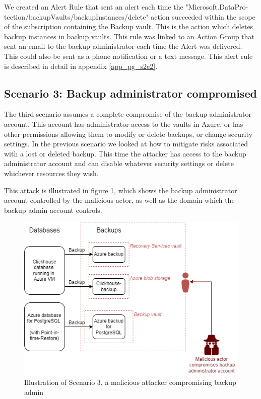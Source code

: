 We created an Alert Rule that sent an alert each time the "Microsoft.DataPro-tection/backupVaults/backupInstances/delete" action succeeded within the scope of the subscription containing the Backup vault. This is the action which deletes backup instances in backup vaults. This rule was linked to an Action Group that sent an email to the backup administrator each time the Alert was delivered. This could also be sent as a phone notification or a text message. This alert rule is described in detail in appendix \ref{app_pg_s2e2}. 

\subsection{Scenario 3: Backup administrator compromised}
The third scenario assumes a complete compromise of the backup administrator account.
This account has administrator access to the vaults in Azure,
or has other permissions allowing them to modify or delete backups, or change security settings.
In the previous scenario we looked at how to mitigate risks associated with a lost or deleted backup. This time the attacker has access to the backup administrator account and can disable whatever security settings or delete whichever resources they wish. 

This attack is illustrated in figure \ref{fig:scenario 3}, which shows the backup administrator account controlled by the malicious actor, as well as the domain which the backup admin account controls.

\begin{figure}[h!]
    \centering
    \includegraphics[width=.9\linewidth]{figures/Scenario3.png}
    \caption{Illustration of Scenario 3, a malicious attacker compromising backup admin}
    \label{fig:scenario 3}
\end{figure}


